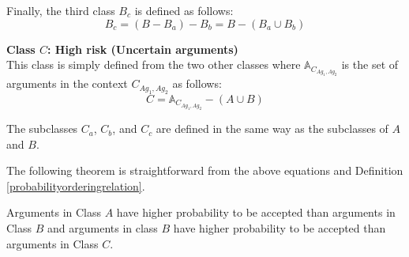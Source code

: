 Finally, the third class $B_c$ is defined as follows:
\begin{equation}
B_c = (B-B_a)-B_b = B-(B_a \cup B_b)
\end{equation}

\textbf{Class $C$: High risk (Uncertain arguments)}\\
This class is simply defined from the two other classes where $\mathbb{A}_{C_{Ag_1, Ag_2}}$ is the set of arguments in the
context $C_{Ag_1, Ag_2}$ as follows:
\begin{equation}
C = \mathbb{A}_{C_{Ag_1, Ag_2}}-(A \cup B)
\end{equation}

The subclasses $C_a$, $C_b$, and $C_c$ are defined in the same way as the subclasses of $A$ and $B$.

The following theorem is straightforward from the above equations and Definition \ref{probabilityorderingrelation}.
\begin{theorem}
Arguments in Class $A$ have higher probability to be accepted than arguments in Class $B$ and arguments in class $B$ have higher
probability to be accepted than arguments in Class $C$.
\end{theorem}




